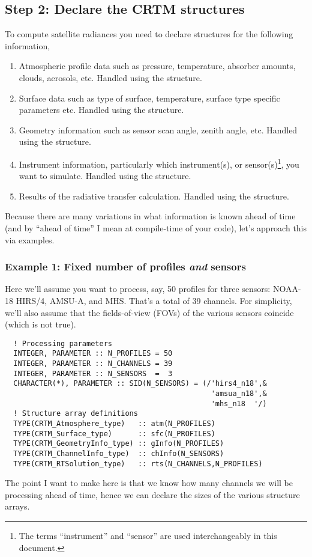 \subsection{Step 2: Declare the CRTM structures}
\label{sec:quick_start_step2}
To compute satellite radiances you need to declare structures for the following information,
\begin{enumerate}
  \item Atmospheric profile data such as pressure, temperature, absorber amounts, clouds, aerosols, etc. Handled using the \Atmosphere{} structure.
  \item Surface data such as type of surface, temperature, surface type specific parameters etc. Handled using the \Surface{} structure.
  \item Geometry information such as sensor scan angle, zenith angle, etc. Handled using the \GeometryInfo{} structure.
  \item Instrument information, particularly which instrument(s), or sensor(s)\footnote{The terms ``instrument'' and ``sensor'' are used interchangeably in this document.}, you want to simulate. Handled using the \ChannelInfo{} structure.
  \item Results of the radiative transfer calculation. Handled using the \RTSolution{} structure.
\end{enumerate}
 Because there are many variations in what information is known ahead of time (and by ``ahead of time'' I mean at compile-time of your code), let's approach this via examples.

\subsubsection{Example 1: Fixed number of profiles \textit{and} sensors}
\label{sec:quick_start_step2_ex1}

Here we'll assume you want to process, say, 50 profiles for three sensors: NOAA-18 HIRS/4, AMSU-A, and MHS. That's a total of 39 channels. For simplicity, we'll also assume that the fields-of-view (FOVs) of the various sensors coincide (which is not true).
\begin{ttfamily}
  \begin{verbatim}
  ! Processing parameters
  INTEGER, PARAMETER :: N_PROFILES = 50
  INTEGER, PARAMETER :: N_CHANNELS = 39
  INTEGER, PARAMETER :: N_SENSORS  =  3
  CHARACTER(*), PARAMETER :: SID(N_SENSORS) = (/'hirs4_n18',&
                                                'amsua_n18',&
                                                'mhs_n18  '/)
  ! Structure array definitions
  TYPE(CRTM_Atmosphere_type)   :: atm(N_PROFILES)
  TYPE(CRTM_Surface_type)      :: sfc(N_PROFILES)
  TYPE(CRTM_GeometryInfo_type) :: gInfo(N_PROFILES)  
  TYPE(CRTM_ChannelInfo_type)  :: chInfo(N_SENSORS)  
  TYPE(CRTM_RTSolution_type)   :: rts(N_CHANNELS,N_PROFILES)\end{verbatim}
\end{ttfamily}
The point I want to make here is that we know how many channels we will be processing ahead of time, hence we can declare the sizes of the various structure arrays.

